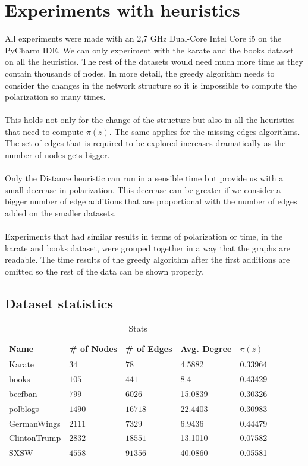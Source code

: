 \section{Experiments with heuristics}
\label{sec:experimHeuristics}

All experiments were made with an 2,7 GHz Dual-Core Intel Core i5 on the PyCharm IDE. We can only experiment with the karate and the books dataset on all the heuristics. The rest of the datasets would need much more time as they contain thousands of nodes. In more detail, the greedy algorithm needs to consider the changes in the network structure so it is impossible to compute the polarization so many times.
\\
\\ 
This holds not only for the change of the structure but also in all the heuristics that need to compute $\pi(z)$. The same applies for the missing edges algorithms. The set of edges that is required to be explored increases dramatically as the number of nodes gets bigger. 
\\
\\
Only the Distance heuristic can run in a sensible time but provide us with a small decrease in polarization. This decrease can be greater if we consider a bigger number of edge additions that are proportional with the number of edges added on the smaller datasets. 
\\
\\
Experiments that had similar results in terms of polarization or time, in the karate and books dataset, were grouped together in a way that the graphs are readable. The time results of the greedy algorithm after the first additions are omitted so the rest of the data can be shown properly.

\subsection{Dataset statistics}

\begin{table}[H]
 \centering
 \caption{Stats}
 \label{tab:statistics}
 \begin{tabular}{| l || l | l | l | l |}
 \hline
  Name & \# of Nodes & \# of Edges & Avg. Degree & $\pi(z)$\\
  \hline
  \hline
  Karate & $34$ & $78$ & 4.5882 &  0.33964\\
  \hline
    books & $105$ & $441$ & 8.4 &  0.43429\\
  \hline
    beefban & $799$ & $6026$ & 15.0839 &  0.30326\\
  \hline
  polblogs & $1490$ & $16718$ & 22.4403 &  0.30983\\
  \hline
  GermanWings & $2111$ & $7329$ & 6.9436 &  0.44479\\
  \hline
  ClintonTrump & $2832$ & $18551$ & 13.1010 &  0.07582\\
  \hline
  SXSW & $4558$ & $91356$ & 40.0860 &  0.05581\\
  \hline
 \end{tabular}
 \end{table}



